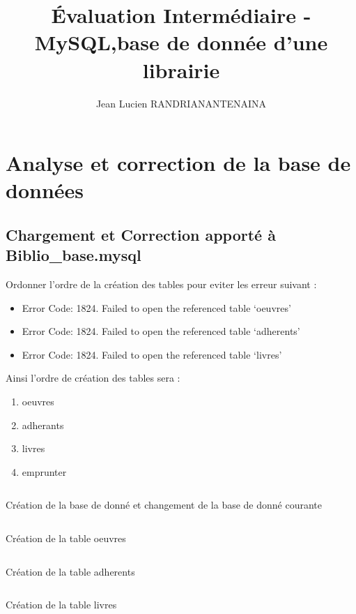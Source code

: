\documentclass{article}
\title{Évaluation Intermédiaire - MySQL,base de donnée d’une librairie}
\author{Jean Lucien RANDRIANANTENAINA}
\begin{document}
\maketitle
\newpage
\tableofcontents
\newpage
\listoflistings
\newpage

\section{Analyse et correction de la base de données}

\subsection{Chargement et Correction apporté à Biblio\_base.mysql}

Ordonner l'ordre de la création des tables pour eviter les erreur
suivant :

\begin{itemize}
	\item Error Code: 1824. Failed to open the referenced table `oeuvres'
	\item Error Code: 1824. Failed to open the referenced table `adherents'
	\item Error Code: 1824. Failed to open the referenced table `livres'
\end{itemize}


Ainsi l'ordre de création des tables sera :
\begin{enumerate}
	\item oeuvres
	\item adherants
	\item livres
	\item emprunter
\end{enumerate}

\begin{listing}[H]
\inputminted{mysql}{code/create_db.sql}
\caption{Création de la base de donné  et changement de la base de donné courante}
\end{listing}

\begin{listing}[H]
\inputminted{mysql}{code/create_oeuvres.sql}
\caption{Création de la table oeuvres}
\end{listing}

\begin{listing}[H]
\inputminted{mysql}{code/create_adherents.sql}
\caption{Création de la table adherents}
\end{listing}

\begin{listing}[H]
\inputminted{mysql}{code/create_livres.sql}
\caption{Création de la table livres}
\end{listing}
\end{document}
